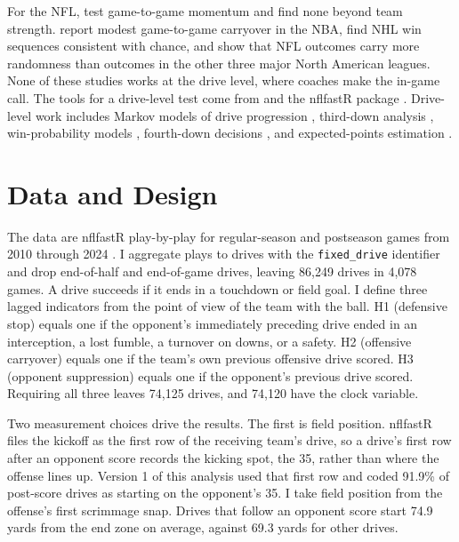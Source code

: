 \documentclass[11pt]{article}
\begin{document}
For the NFL, \citet{fry2012searching} test game-to-game momentum and find none beyond team strength. \citet{arkes2011finally} report modest game-to-game carryover in the NBA, \citet{steeger2021winning} find NHL win sequences consistent with chance, and \citet{lopez2018often} show that NFL outcomes carry more randomness than outcomes in the other three major North American leagues. None of these studies works at the drive level, where coaches make the in-game call. The tools for a drive-level test come from \citet{yurko2018nflwar} and the nflfastR package \citep{nflfastr2024}. Drive-level work includes Markov models of drive progression \citep{goldner2012markov}, third-down analysis \citep{cafarelli2012third}, win-probability models \citep{lock2014random}, fourth-down decisions \citep{yam2019what}, and expected-points estimation \citep{brill2024expected}.

\section{Data and Design}\label{sec:data}

The data are nflfastR play-by-play for regular-season and postseason games from 2010 through 2024 \citep{nflfastr2024}. I aggregate plays to drives with the \texttt{fixed\_drive} identifier and drop end-of-half and end-of-game drives, leaving 86,249 drives in 4,078 games. A drive succeeds if it ends in a touchdown or field goal. I define three lagged indicators from the point of view of the team with the ball. H1 (defensive stop) equals one if the opponent's immediately preceding drive ended in an interception, a lost fumble, a turnover on downs, or a safety. H2 (offensive carryover) equals one if the team's own previous offensive drive scored. H3 (opponent suppression) equals one if the opponent's previous drive scored. Requiring all three leaves 74,125 drives, and 74,120 have the clock variable.

Two measurement choices drive the results. The first is field position. nflfastR files the kickoff as the first row of the receiving team's drive, so a drive's first row after an opponent score records the kicking spot, the 35, rather than where the offense lines up. Version 1 of this analysis used that first row and coded 91.9\% of post-score drives as starting on the opponent's 35. I take field position from the offense's first scrimmage snap. Drives that follow an opponent score start 74.9 yards from the end zone on average, against 69.3 yards for other drives.
\end{document}
